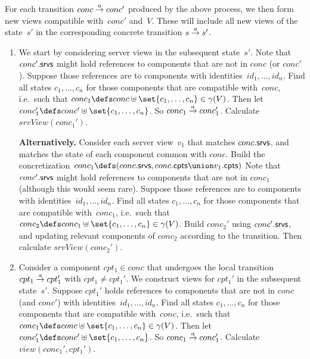 
For each transition $conc \stackrel{a}\rightarrow conc'$ produced by the above process, we
then form new views compatible with~$conc'$ and~$V$.  These will include all
new views of the state~$s'$ in the corresponding concrete transition $s
\stackrel{a}\rightarrow s'$. 
%
\begin{enumerate}
\item \label{case:view-server} We start by considering server views in the
  subsequent state~$s'$.  Note that $conc'.\mathsf{srvs}$ might hold references to
  components that are not in $conc$ (or $conc'$).  Suppose those references
  are to components with identities~$id_1, \ldots, id_n$.  Find all states
  $c_1, \ldots, c_n$ for those components that are compatible with~$conc$,
  i.e.~such that $conc_1 \defs conc \uplus \set{c_1,\ldots,c_n} \in
  \gamma(V)$.  Then let $conc_1' \defs conc' \uplus \set{c_1,\ldots,c_n}$.  So
  $conc_1 \stackrel{a}\rightarrow conc_1'$.  Calculate $srvView(conc_1')$.

\textbf{Alternatively.}  Consider each server view~$v_1$ that matches
$conc.\mathsf{srvs}$, and matches the state of each component common with $conc$.
Build the concretization~$conc_1 \defs (conc.\srv, conc.\cpt \union v_1.\cpt)$
Note that $conc'.\mathsf{srvs}$ might hold references to components that are not in
$conc_1$ (although this would seem rare).  Suppose those references are to
components with identities~$id_1, \ldots, id_n$.  Find all states $c_1,
\ldots, c_n$ for those components that are compatible with~$conc_1$, i.e.~such
that $conc_2 \defs conc_1 \uplus \set{c_1,\ldots,c_n} \in \gamma(V)$.  Build
$conc_2'$ using $conc'.\mathsf{srvs}$, and updating relevant components of $conc_2$
according to the transition.  Then calculate $srvView(conc_2')$.

\item \label{case:view-principal-changes} Consider a component $cpt_1 \in
  conc$ that undergoes the local transition $cpt_1 \stackrel{a}\rightarrow cpt_1'$ with
  $cpt_1 \ne cpt_1'$.  We construct views for $cpt_1'$ in the subsequent
  state~$s'$.  Suppose $cpt_1'$ holds references to components that are not in
  $conc$ (and $conc'$) with identities~$id_1, \ldots, id_n$.  Find all states
  $c_1, \ldots, c_n$ for those components that are compatible with~$conc$,
  i.e.~such that $conc_1 \defs conc \uplus \set{c_1,\ldots,c_n} \in
  \gamma(V)$.  Then let $conc_1' \defs conc' \uplus \set{c_1,\ldots,c_n}$.  So
  $conc_1 \stackrel{a}\rightarrow conc_1'$.  Calculate $view(conc_1', cpt_1')$.


\end{enumerate}
